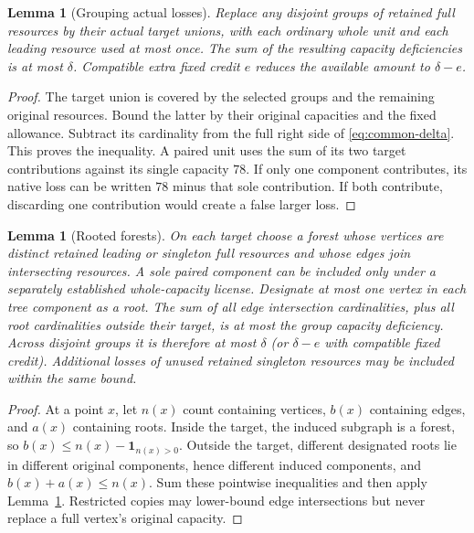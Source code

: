 \documentclass[11pt,letterpaper]{article}
\newtheorem{lemma}[theorem]{Lemma}
\theoremstyle{definition}\newtheorem{definition}[theorem]{Definition}
\begin{document}
\begin{lemma}[Grouping actual losses]\label{lem:common-loss}
Replace any disjoint groups of retained full resources by their actual
target unions, with each ordinary whole unit and each leading resource
used at most once. The sum of the resulting capacity deficiencies is
at most $\delta$. Compatible extra fixed credit $e$ reduces the
available amount to $\delta-e$.
\end{lemma}
\begin{proof}
The target union is covered by the selected groups and the remaining
original resources. Bound the latter by their original capacities and
the fixed allowance. Subtract its cardinality from the full right side
of \eqref{eq:common-delta}. This proves the inequality. A paired unit
uses the sum of its two target contributions against its single
capacity $78$. If only one component contributes, its native loss can
be written $78$ minus that sole contribution. If both contribute,
discarding one contribution would create a false larger loss.
\end{proof}

\begin{lemma}[Rooted forests]\label{lem:common-forest}
On each target choose a forest whose vertices are distinct retained
leading or singleton full resources and whose edges join intersecting
resources. A sole paired component can be included only under a
separately established whole-capacity license. Designate
at most one vertex in each tree component as a root. The sum of all
edge intersection cardinalities, plus all root cardinalities outside
their target, is at most the group capacity deficiency. Across disjoint
groups it is therefore at most $\delta$ (or $\delta-e$ with compatible
fixed credit). Additional losses of unused retained singleton resources
may be included within the same bound.
\end{lemma}
\begin{proof}
At a point $x$, let $n(x)$ count containing vertices, $b(x)$ containing
edges, and $a(x)$ containing roots. Inside the target, the induced
subgraph is a forest, so $b(x)\le n(x)-\mathbf1_{n(x)>0}$.
Outside the target, different designated roots lie in different
original components, hence different induced components, and
$b(x)+a(x)\le n(x)$. Sum these pointwise inequalities and then apply
Lemma~\ref{lem:common-loss}. Restricted copies may lower-bound edge
intersections but never replace a full vertex's original capacity.
\end{proof}
\end{document}
